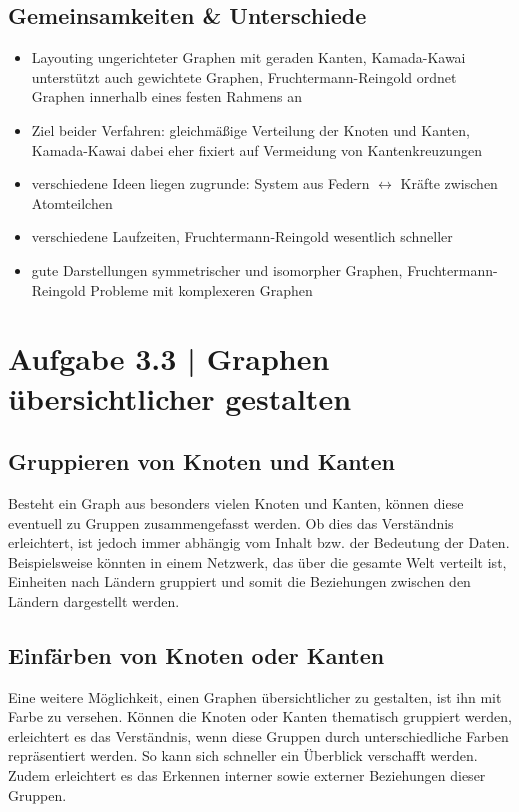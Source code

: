 \documentclass[a4paper,12pt,ngerman]{scrartcl}
\begin{document}
\subsection*{Gemeinsamkeiten \& Unterschiede}
\begin{itemize}
    \item Layouting ungerichteter Graphen mit geraden Kanten, Kamada-Kawai unterstützt auch gewichtete Graphen, Fruchtermann-Reingold ordnet Graphen innerhalb eines festen Rahmens an
    \item Ziel beider Verfahren: gleichmäßige Verteilung der Knoten und Kanten, Kamada-Kawai dabei eher fixiert auf Vermeidung von Kantenkreuzungen
    \item verschiedene Ideen liegen zugrunde: System aus Federn $\leftrightarrow$ Kräfte zwischen Atomteilchen
    \item verschiedene Laufzeiten, Fruchtermann-Reingold wesentlich schneller
    \item gute Darstellungen symmetrischer und isomorpher Graphen, Fruchtermann-Reingold Probleme mit komplexeren Graphen
\end{itemize}

\section{Aufgabe 3.3 | Graphen übersichtlicher gestalten}

\subsection*{Gruppieren von Knoten und Kanten}
Besteht ein Graph aus besonders vielen Knoten und Kanten, können diese eventuell zu Gruppen zusammengefasst werden. Ob dies das Verständnis erleichtert, ist jedoch immer abhängig vom Inhalt bzw. der Bedeutung der Daten. Beispielsweise könnten in einem Netzwerk, das über die gesamte Welt verteilt ist, Einheiten nach Ländern gruppiert  und somit die Beziehungen zwischen den Ländern dargestellt werden.

\subsection*{Einfärben von Knoten oder Kanten}
Eine weitere Möglichkeit, einen Graphen übersichtlicher zu gestalten, ist ihn mit Farbe zu versehen. Können die Knoten oder Kanten thematisch gruppiert werden, erleichtert es das Verständnis, wenn diese Gruppen durch unterschiedliche Farben repräsentiert werden. So kann sich schneller ein Überblick verschafft werden. Zudem erleichtert es das Erkennen interner sowie externer Beziehungen dieser Gruppen.
\end{document}
